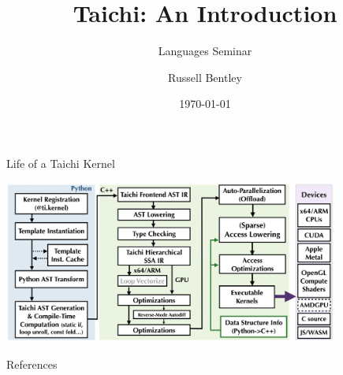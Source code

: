 \documentclass{beamer}[10pt]
\title{Taichi: An Introduction}
\subtitle{Languages Seminar}
\author{Russell Bentley}
\institute{Stony Brook}
\date{\today}
\begin{document}
\frame{\titlepage}









\begin{frame}{Life of a Taichi Kernel}
  \begin{centering}
    \includegraphics[width=11cm]{life_of_a_taichi_kernel.png}
  \end{centering}
\end{frame}

\begin{frame}[allowframebreaks]{References}
    \tiny
    \printbibliography
\end{frame}
\end{document}

